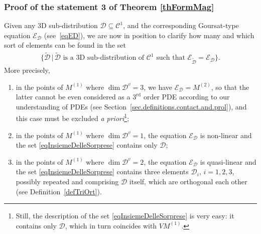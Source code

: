 \documentclass[pdftex]{sigma}
\newcommand{\C}{\mathcal{C}}
\newcommand{\D}{\mathcal{D}}
\newcommand{\E}{\mathcal{E}}
\newcommand{\Rd}{^\textrm{rd}}
\numberwithin{equation}{section}
\begin{document}
\subsubsection{Proof of the statement 3 of Theorem \ref{thFormMag}}\label{sec.3.3}

Given any 3D sub-distribution $\D\subseteq \C^1$,
and the corresponding Goursat-type equation $\E_\D$ (see~\eqref{eqED}), we are now in position to clarify how many and which sort of elements can be found in the set
\begin{gather}\label{eqInsiemeDelleSorprese}
\big\{\widetilde{\D}\,|\, \widetilde{\D} \textrm{ is a 3D sub-distribution of }\C^1\textrm{ such that }\E_{\widetilde{\D}}=\E_\D\big\}.
\end{gather}
More precisely,
\begin{enumerate}\itemsep=0pt
\item[1)] in the points of $M^{(1)}$ where $\dim\D^v=3$, we have $\E_\D=M^{(2)}$, so that the latter cannot be even considered as a $3\Rd$ order PDE according to our understanding of PDEs (see Section~\ref{sec.definitions.contact.and.prol}), and this case must be excluded \emph{a priori}\footnote{Still, the description of the set \eqref{eqInsiemeDelleSorprese} is very easy: it contains only $\D$, which in turn coincides with $VM^{(1)}$.};
\item[2)] in the points of $M^{(1)}$ where $\dim\D^v=1$, the equation $\E_\D$ is non-linear and the set \eqref{eqInsiemeDelleSorprese} contains only $\D$;
\item[3)] in the points of $M^{(1)}$ where $\dim\D^v=2$, the equation $\E_\D$ is quasi-linear and the set \eqref{eqInsiemeDelleSorprese} contains three elements $\D_i$, $i=1,2,3$, possibly repeated and comprising $\D$ itself, which
are {orthogonal} each other (see Def\/inition~\ref{defTriOrt}).
\end{enumerate}
\end{document}
